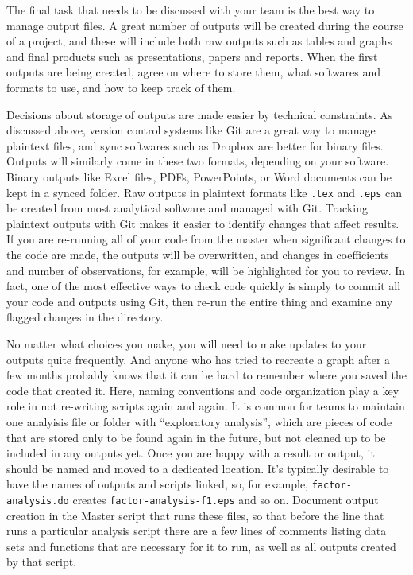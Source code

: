 The final task that needs to be discussed with your team is the best way to manage output files.
A great number of outputs will be created during the course of a project,
and these will include both raw outputs such as tables and graphs
and final products such as presentations, papers and reports.
When the first outputs are being created, agree on where to store them,
what softwares and formats to use, and how to keep track of them.

Decisions about storage of outputs are made easier by technical constraints.
As discussed above, version control systems like Git are a great way to manage
plaintext files, and sync softwares such as Dropbox are better for binary files.
Outputs will similarly come in these two formats, depending on your software.
Binary outputs like Excel files, PDFs, PowerPoints, or Word documents can be kept in a synced folder.
Raw outputs in plaintext formats like \texttt{.tex} and \texttt{.eps}
can be created from most analytical software and managed with Git.
Tracking plaintext outputs with Git makes it easier to identify changes that affect results.
If you are re-running all of your code from the master when significant changes to the code are made,
the outputs will be overwritten, and changes in coefficients and number of observations, for example,
will be highlighted for you to review.
In fact, one of the most effective ways to check code quickly
is simply to commit all your code and outputs using Git,
then re-run the entire thing and examine any flagged changes in the directory.

No matter what choices you make,
you will need to make updates to your outputs quite frequently.
And anyone who has tried to recreate a graph after a few months probably knows
that it can be hard to remember where you saved the code that created it.
Here, naming conventions and code organization play a key role
in not re-writing scripts again and again.
It is common for teams to maintain one analyisis file or folder with ``exploratory analysis'',
which are pieces of code that are stored only to be found again in the future,
but not cleaned up to be included in any outputs yet.
Once you are happy with a result or output,
it should be named and moved to a dedicated location.
It's typically desirable to have the names of outputs and scripts linked,
so, for example, \texttt{factor-analysis.do} creates \texttt{factor-analysis-f1.eps} and so on.
Document output creation in the Master script that runs these files,
so that before the line that runs a particular analysis script
there are a few lines of comments listing
data sets and functions that are necessary for it to run,
as well as all outputs created by that script.

